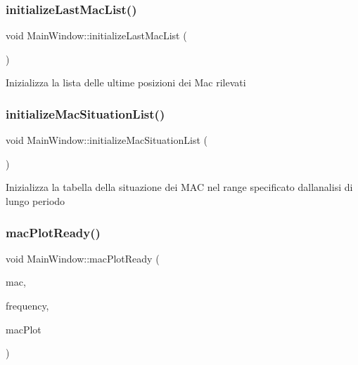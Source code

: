 \subsubsection{\texorpdfstring{initialize\+Last\+Mac\+List()}{initializeLastMacList()}}
{\footnotesize\ttfamily void Main\+Window\+::initialize\+Last\+Mac\+List (\begin{DoxyParamCaption}{ }\end{DoxyParamCaption})}

Inizializza la lista delle ultime posizioni dei Mac rilevati \mbox{\label{class_main_window_a23772b94e161e6e2e5529167efd48037}} 
\subsubsection{\texorpdfstring{initialize\+Mac\+Situation\+List()}{initializeMacSituationList()}}
{\footnotesize\ttfamily void Main\+Window\+::initialize\+Mac\+Situation\+List (\begin{DoxyParamCaption}{ }\end{DoxyParamCaption})}

Inizializza la tabella della situazione dei M\+AC nel range specificato dall\textquotesingle{}analisi di lungo periodo \mbox{\label{class_main_window_a3f57c01d85e1d4790edb3308b944e3d2}} 
\subsubsection{\texorpdfstring{mac\+Plot\+Ready()}{macPlotReady()}}
{\footnotesize\ttfamily void Main\+Window\+::mac\+Plot\+Ready (\begin{DoxyParamCaption}\item[{Q\+String\+List}]{mac,  }\item[{Q\+String\+List}]{frequency,  }\item[{\hyperlink{class_mac_chart}{Mac\+Chart} $\ast$}]{mac\+Plot }\end{DoxyParamCaption})}

